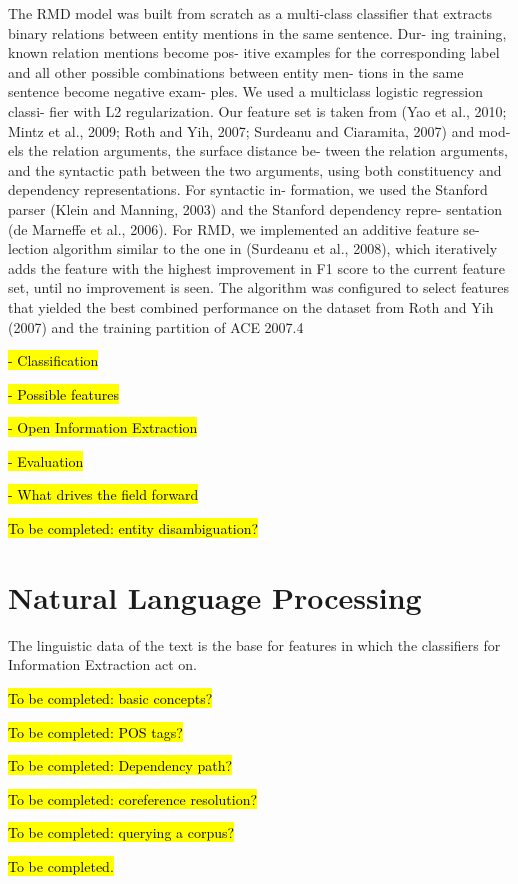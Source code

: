 \documentclass[11pt,a4paper,openright]{memoir}
\begin{document}
The RMD model was built from scratch as a multi-class classifier that extracts binary relations between entity mentions in the same sentence. Dur- ing training, known relation mentions become pos- itive examples for the corresponding label and all other possible combinations between entity men- tions in the same sentence become negative exam- ples. We used a multiclass logistic regression classi- fier with L2 regularization. Our feature set is taken from (Yao et al., 2010; Mintz et al., 2009; Roth and Yih, 2007; Surdeanu and Ciaramita, 2007) and mod- els the relation arguments, the surface distance be- tween the relation arguments, and the syntactic path between the two arguments, using both constituency and dependency representations. For syntactic in- formation, we used the Stanford parser (Klein and Manning, 2003) and the Stanford dependency repre- sentation (de Marneffe et al., 2006).
For RMD, we implemented an additive feature se- lection algorithm similar to the one in (Surdeanu et al., 2008), which iteratively adds the feature with the highest improvement in F1 score to the current feature set, until no improvement is seen. The algorithm was configured to select features that yielded the best combined performance on the dataset from Roth and Yih (2007) and the training partition of ACE 2007.4 


\hl{- Classification}

\hl{- Possible features}

\hl{- Open Information Extraction}

\hl{- Evaluation}

\hl{- What drives the field forward}

\hl{To be completed: entity disambiguation?}

\section{Natural Language Processing}

The linguistic data of the text is the base for features in which the classifiers for Information Extraction act on.

\hl{To be completed: basic concepts?}

\hl{To be completed: POS tags?}

\hl{To be completed: Dependency path?}

\hl{To be completed: coreference resolution?}

\hl{To be completed: querying a corpus?}

\hl{To be completed.}
\end{document}
